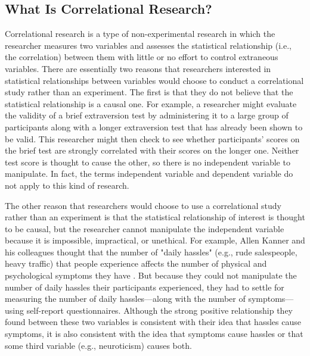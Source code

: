 \subsection{What Is Correlational Research?}

Correlational research is a type of non-experimental research in which the researcher measures two variables and assesses the statistical relationship (i.e., the correlation) between them with little or no effort to control extraneous variables. There are essentially two reasons that researchers interested in statistical relationships between variables would choose to conduct a correlational study rather than an experiment. The first is that they do not believe that the statistical relationship is a causal one. For example, a researcher might evaluate the validity of a brief extraversion test by administering it to a large group of participants along with a longer extraversion test that has already been shown to be valid. This researcher might then check to see whether participants' scores on the brief test are strongly correlated with their scores on the longer one. Neither test score is thought to cause the other, so there is no independent variable to manipulate. In fact, the terms independent variable and dependent variable do not apply to this kind of research.

The other reason that researchers would choose to use a correlational study rather than an experiment is that the statistical relationship of interest is thought to be causal, but the researcher cannot manipulate the independent variable because it is impossible, impractical, or unethical. For example, Allen Kanner and his colleagues thought that the number of "daily hassles" (e.g., rude salespeople, heavy traffic) that people experience affects the number of physical and psychological symptoms they have \citep{kanner_comparison_1981}. But because they could not manipulate the number of daily hassles their participants experienced, they had to settle for measuring the number of daily hassles---along with the number of symptoms---using self-report questionnaires. Although the strong positive relationship they found between these two variables is consistent with their idea that hassles cause symptoms, it is also consistent with the idea that symptoms cause hassles or that some third variable (e.g., neuroticism) causes both.


